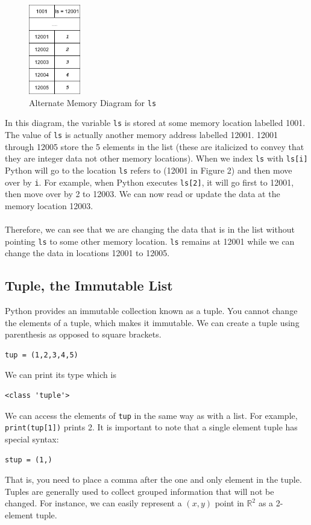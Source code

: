 \documentclass{article}
\begin{document}
\begin{figure}[hbt]
    \centering
    \includegraphics[width=0.2\textwidth]{pointer_diagram_2.png}
    \caption{Alternate Memory Diagram for \texttt{ls}}
    \label{fig:my_label}
\end{figure}
\noindent In this diagram, the variable \texttt{ls} is stored at some memory location labelled 1001. The value of \texttt{ls} is actually another memory address labelled 12001. 12001 through 12005 store the 5 elements in the list (these are italicized to convey that they are integer data not other memory locations). When we index \texttt{ls} with \texttt{ls[i]} Python will go to the location \texttt{ls} refers to (12001 in Figure 2) and then move over by \texttt{i}. For example, when Python executes \texttt{ls[2]}, it will go first to 12001, then move over by 2 to 12003. We can now read or update the data at the memory location 12003.\\\\
Therefore, we can see that we are changing the data that is in the list without pointing \texttt{ls} to some other memory location. \texttt{ls} remains at 12001 while we can change the data in locations 12001 to 12005.

\subsection{Tuple, the Immutable List}
Python provides an immutable collection known as a tuple. You cannot change the elements of a tuple, which makes it immutable. We can create a tuple using parenthesis as opposed to square brackets.
\begin{verbatim}
tup = (1,2,3,4,5)
\end{verbatim}
We can print its type which is
\begin{verbatim}
<class 'tuple'>
\end{verbatim}
We can access the elements of \texttt{tup} in the same way as with a list. For example, \texttt{print(tup[1])} prints 2. It is important to note that a single element tuple has special syntax:
\begin{verbatim}
stup = (1,)
\end{verbatim}
That is, you need to place a comma after the one and only element in the tuple. Tuples are generally used to collect grouped information that will not be changed. For instance, we can easily represent a $(x,y)$ point in $\mathbb{R}^2$ as a 2-element tuple. 
\end{document}
